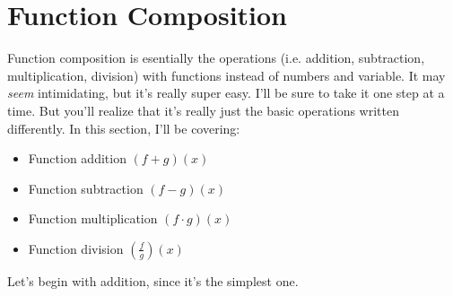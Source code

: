 \chapter{Function Composition}
Function composition is esentially the operations (i.e. addition, subtraction, multiplication, division) with functions instead of numbers and variable. It may \textit{seem} intimidating, but it's really super easy. I'll be sure to take it one step at a time. But you'll realize that it's really just the basic operations written differently. In this section, I'll be covering:
\begin{itemize}
    \item Function addition $(f + g)(x)$
    \item Function subtraction $(f - g)(x)$
    \item Function multiplication $(f \cdot g)(x)$
    \item Function division $\displaystyle \left(\frac{f}{g} \right)(x)$
\end{itemize}
Let's begin with addition, since it's the simplest one.